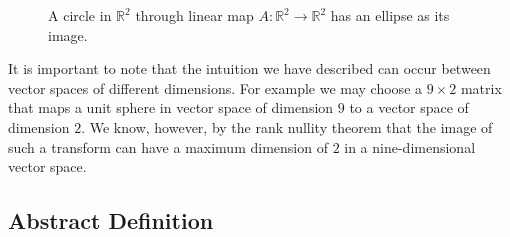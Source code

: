 \documentclass[12pt,reqno,twoside,titlepage]{article}
\theoremstyle{definition}
\begin{document}
\begin{figure}[htb]
  \begin{centering}
  \end{centering}
  \caption{A circle in $\mathbb{R}^2$ through linear map $A:\mathbb{R}^2 \to \mathbb{R}^2$ has an ellipse as its image.}
  \label{fig:svd:1}
\end{figure}

It is important to note that the intuition we have described can occur between vector spaces of different dimensions.
For example we may choose a $9 \times 2$ matrix that maps a unit sphere in vector space of dimension $9$ to a vector space of dimension $2$.
We know, however, by the rank nullity theorem that the image of such a transform can have a maximum dimension of $2$ in a nine-dimensional vector space.

\subsection{Abstract Definition}
\cite{trefethen97}
\label{sec:svd:2}
\end{document}
